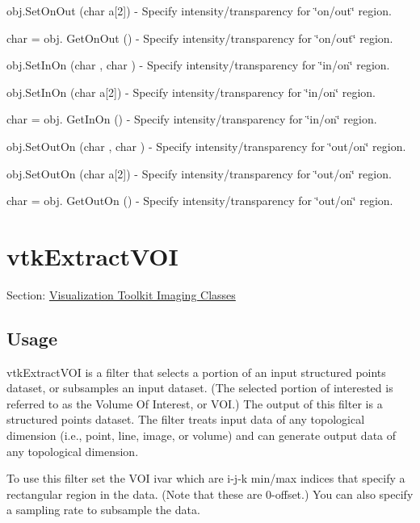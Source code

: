 \begin{DoxyItemize}
\item {\ttfamily obj.\-Set\-On\-Out (char a\mbox{[}2\mbox{]})} -\/ Specify intensity/transparency for \char`\"{}on/out\char`\"{} region.  
\item {\ttfamily char = obj. Get\-On\-Out ()} -\/ Specify intensity/transparency for \char`\"{}on/out\char`\"{} region.  
\item {\ttfamily obj.\-Set\-In\-On (char , char )} -\/ Specify intensity/transparency for \char`\"{}in/on\char`\"{} region.  
\item {\ttfamily obj.\-Set\-In\-On (char a\mbox{[}2\mbox{]})} -\/ Specify intensity/transparency for \char`\"{}in/on\char`\"{} region.  
\item {\ttfamily char = obj. Get\-In\-On ()} -\/ Specify intensity/transparency for \char`\"{}in/on\char`\"{} region.  
\item {\ttfamily obj.\-Set\-Out\-On (char , char )} -\/ Specify intensity/transparency for \char`\"{}out/on\char`\"{} region.  
\item {\ttfamily obj.\-Set\-Out\-On (char a\mbox{[}2\mbox{]})} -\/ Specify intensity/transparency for \char`\"{}out/on\char`\"{} region.  
\item {\ttfamily char = obj. Get\-Out\-On ()} -\/ Specify intensity/transparency for \char`\"{}out/on\char`\"{} region.  
\end{DoxyItemize}\hypertarget{vtkimaging_vtkextractvoi}{}\section{vtk\-Extract\-V\-O\-I}\label{vtkimaging_vtkextractvoi}
Section\-: \hyperlink{sec_vtkimaging}{Visualization Toolkit Imaging Classes} \hypertarget{vtkwidgets_vtkxyplotwidget_Usage}{}\subsection{Usage}\label{vtkwidgets_vtkxyplotwidget_Usage}
vtk\-Extract\-V\-O\-I is a filter that selects a portion of an input structured points dataset, or subsamples an input dataset. (The selected portion of interested is referred to as the Volume Of Interest, or V\-O\-I.) The output of this filter is a structured points dataset. The filter treats input data of any topological dimension (i.\-e., point, line, image, or volume) and can generate output data of any topological dimension.

To use this filter set the V\-O\-I ivar which are i-\/j-\/k min/max indices that specify a rectangular region in the data. (Note that these are 0-\/offset.) You can also specify a sampling rate to subsample the data.

